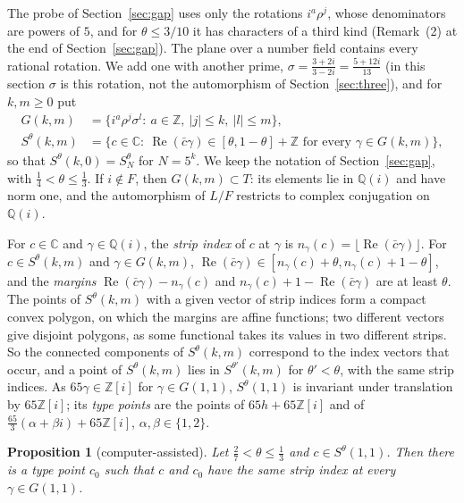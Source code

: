 \documentclass[11pt,a4paper]{amsart}
\newtheorem{proposition}{Proposition}
\theoremstyle{remark}
\newcommand{\Q}{\mathbb{Q}}
\newcommand{\Z}{\mathbb{Z}}
\newcommand{\C}{\mathbb{C}}
\begin{document}
The probe of Section~\ref{sec:gap} uses only the rotations $i^a\rho^j$, whose denominators are powers of $5$, and for
$\theta\le3/10$ it has characters of a third kind (Remark~(2) at the end of Section~\ref{sec:gap}). The plane over a
number field contains every rational rotation. We add one with another prime, $\sigma=\frac{3+2i}{3-2i}=
\frac{5+12i}{13}$ (in this section $\sigma$ is this rotation, not the automorphism of Section~\ref{sec:three}), and for
$k,m\ge0$ put
\begin{align*}
G(k,m)&=\{i^a\rho^j\sigma^l:\ a\in\Z,\ |j|\le k,\ |l|\le m\},\\
S^\theta(k,m)&=\{c\in\C:\ \operatorname{Re}(\bar c\gamma)\in[\theta,1-\theta]+\Z\text{ for every }\gamma\in G(k,m)\},
\end{align*}
so that $S^\theta(k,0)=S_N^\theta$ for $N=5^k$. We keep the notation of Section~\ref{sec:gap}, with
$\frac14<\theta\le\frac13$. If $i\notin F$, then $G(k,m)\subset T$: its elements lie in $\Q(i)$ and have norm one, and
the automorphism of $L/F$ restricts to complex conjugation on $\Q(i)$.

For $c\in\C$ and $\gamma\in\Q(i)$, the \emph{strip index} of $c$ at $\gamma$ is
$n_\gamma(c)=\lfloor\operatorname{Re}(\bar c\gamma)\rfloor$. For $c\in S^\theta(k,m)$ and $\gamma\in G(k,m)$,
$\operatorname{Re}(\bar c\gamma)\in[n_\gamma(c)+\theta,n_\gamma(c)+1-\theta]$, and the \emph{margins}
$\operatorname{Re}(\bar c\gamma)-n_\gamma(c)$ and $n_\gamma(c)+1-\operatorname{Re}(\bar c\gamma)$ are at least $\theta$.
The points of $S^\theta(k,m)$ with a given vector of strip indices form a compact convex polygon, on which the margins
are affine functions; two different vectors give disjoint polygons, as some functional takes its values in two
different strips. So the connected components of $S^\theta(k,m)$ correspond to the index vectors that occur, and a
point of $S^\theta(k,m)$ lies in $S^{\theta'}(k,m)$ for $\theta'<\theta$, with the same strip indices. As
$65\gamma\in\Z[i]$ for $\gamma\in G(1,1)$, $S^\theta(1,1)$ is invariant under translation by $65\Z[i]$; its \emph{type
points} are the points of $65h+65\Z[i]$ and of $\frac{65}3(\alpha+\beta i)+65\Z[i]$, $\alpha,\beta\in\{1,2\}$.

\begin{proposition}[computer-assisted]\label{prop:window}
Let $\frac27<\theta\le\frac13$ and $c\in S^\theta(1,1)$. Then there is a type point $c_0$ such that $c$ and $c_0$
have the same strip index at every $\gamma\in G(1,1)$.
\end{proposition}
\end{document}
